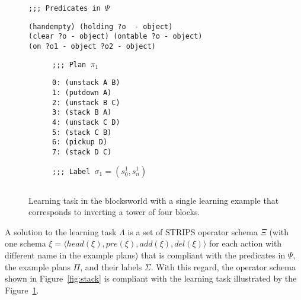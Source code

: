 \documentclass[letterpaper]{article} %
\newcommand{\tup}[1]{{\langle #1 \rangle}}
\begin{document}
\begin{figure}[hbt]
\begin{small}
{\tt ;;; Predicates in $\Psi$}
\begin{verbatim}
(handempty) (holding ?o  - object)
(clear ?o - object) (ontable ?o - object) 
(on ?o1 - object ?o2 - object)  
\end{verbatim}
\end{small}

\vspace{0.3cm}

\begin{subfigure}{.3\textwidth}
\begin{small}
{\tt ;;; Plan $\pi_1$}
\begin{verbatim}
0: (unstack A B)
1: (putdown A)
2: (unstack B C)
3: (stack B A)
4: (unstack C D)
5: (stack C B)
6: (pickup D)
7: (stack D C)
\end{verbatim}
\end{small}
\end{subfigure}%
\begin{subfigure}{.3\textwidth}
{\small\tt ;;; Label $\sigma_1=(s_0^1,s_{n}^1)$}
\begin{lstlisting}[mathescape]
\end{lstlisting}
\vspace{0.6cm}
\end{subfigure}%

 \caption{\small Learning task in the blocksworld with a single learning example that corresponds to inverting a tower of four blocks.}
\label{fig:lexample}
\end{figure}

A solution to the learning task $\Lambda$ is a set of STRIPS operator schema $\Xi$ (with one schema $\xi=\tup{head(\xi),pre(\xi),add(\xi),del(\xi)}$ for each action with different name in the example plans) that is compliant with the predicates in $\Psi$, the example plans $\Pi$, and their labels $\Sigma$. With this regard, the operator schema shown in Figure~\ref{fig:stack} is compliant with the learning task illustrated by the Figure~\ref{fig:lexample}.
\end{document}
